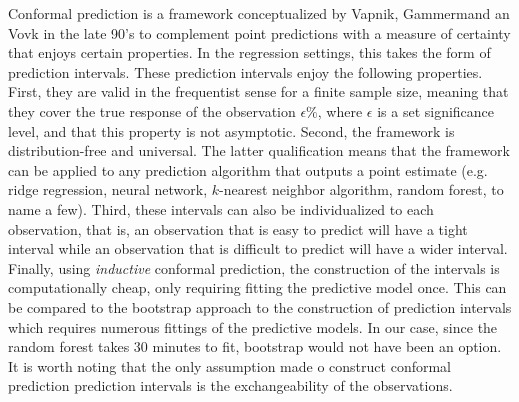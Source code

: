 \documentclass[10pt]{amsart}%
\begin{document}
Conformal prediction is a framework conceptualized by Vapnik, Gammermand an Vovk in the late 90's to complement point predictions with a measure of certainty that enjoys certain properties. In the regression settings, this takes the form of prediction intervals. These prediction intervals enjoy the following properties. First, they are valid in the frequentist sense for a finite sample size, meaning that they cover the true response of the observation $\epsilon \%$, where $\epsilon$ is a set significance level, and that this property is not asymptotic. Second, the framework is distribution-free and universal. The latter qualification means that the framework can be applied to any prediction algorithm that outputs a point estimate (e.g. ridge regression, neural network, $k$-nearest neighbor algorithm, random forest, to name a few). Third, these intervals can also be individualized to each observation, that is, an observation that is easy to predict will have a tight interval while an observation that is difficult to predict will have a wider interval. Finally, using \textit{inductive} conformal prediction, the construction of the intervals is computationally cheap, only requiring fitting the predictive model once. This can be compared to the bootstrap approach to the construction of prediction intervals which requires numerous fittings of the predictive models. In our case, since the random forest takes $30$ minutes to fit, bootstrap would not have been an option. It is worth noting that the only assumption made o construct conformal prediction prediction intervals is the exchangeability of the observations.
\end{document}
